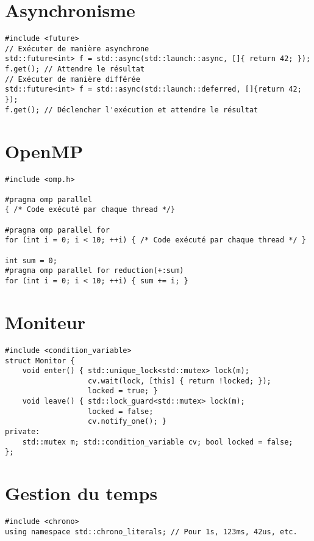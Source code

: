 \documentclass{article}
\begin{document}
\begin{multicols*}{3}
\section*{Asynchronisme}

\begin{lstlisting}
#include <future>
// Exécuter de manière asynchrone
std::future<int> f = std::async(std::launch::async, []{ return 42; });
f.get(); // Attendre le résultat
// Exécuter de manière différée
std::future<int> f = std::async(std::launch::deferred, []{return 42; });
f.get(); // Déclencher l'exécution et attendre le résultat
\end{lstlisting}

\section*{OpenMP}

\begin{lstlisting}
#include <omp.h>

#pragma omp parallel
{ /* Code exécuté par chaque thread */}

#pragma omp parallel for
for (int i = 0; i < 10; ++i) { /* Code exécuté par chaque thread */ }

int sum = 0;
#pragma omp parallel for reduction(+:sum)
for (int i = 0; i < 10; ++i) { sum += i; }
\end{lstlisting}

\section*{Moniteur}

\begin{lstlisting}
#include <condition_variable>
struct Monitor {
    void enter() { std::unique_lock<std::mutex> lock(m);
                   cv.wait(lock, [this] { return !locked; });
                   locked = true; }
    void leave() { std::lock_guard<std::mutex> lock(m);
                   locked = false;
                   cv.notify_one(); }
private:
    std::mutex m; std::condition_variable cv; bool locked = false;
};
\end{lstlisting}

\section*{Gestion du temps}

\begin{lstlisting}
#include <chrono>
using namespace std::chrono_literals; // Pour 1s, 123ms, 42us, etc.


\end{lstlisting}
\end{multicols*}
\end{document}
